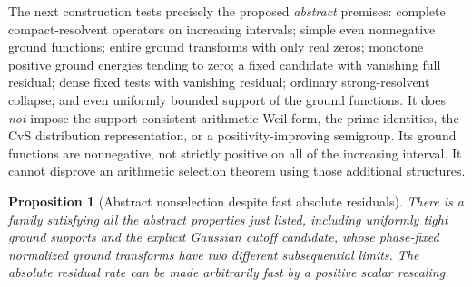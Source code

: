 \documentclass[11pt]{article}
\newtheorem{proposition}[theorem]{Proposition}
\theoremstyle{remark}
\begin{document}
The next construction tests precisely the proposed \emph{abstract}
premises: complete compact-resolvent operators on increasing intervals;
simple even nonnegative ground functions; entire ground transforms with only real
zeros; monotone positive ground energies tending to zero; a fixed
candidate with vanishing full residual; dense fixed tests with vanishing
residual; ordinary strong-resolvent collapse; and even uniformly bounded
support of the ground functions. It does \emph{not} impose the
support-consistent arithmetic Weil form, the prime identities, the
CvS distribution representation, or a positivity-improving semigroup.
Its ground functions are nonnegative, not strictly positive on all of
the increasing interval. It cannot disprove an arithmetic
selection theorem using those additional structures.

\begin{proposition}[Abstract nonselection despite fast absolute residuals]
\label{prop:ns43-ccm-nonselection}
There is a family satisfying all the abstract properties just listed,
including uniformly tight ground supports and the explicit Gaussian
cutoff candidate, whose phase-fixed normalized ground transforms have
two different subsequential limits. The absolute residual rate can be
made arbitrarily fast by a positive scalar rescaling.
\end{proposition}
\end{document}
